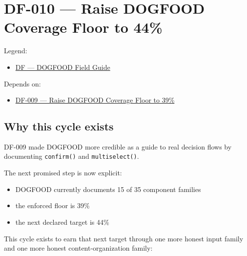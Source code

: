 \chapter{DF-010 --- Raise DOGFOOD Coverage Floor to 44\%}\label{record-072}

\smallskip

Legend:

\begin{itemize}
\tightlist
\item
  \href{https://github.com/flyingrobots/bijou/blob/1853ad902f6bf219326409e7f743a5a1d6517dbc/docs/legends/DF-dogfood-field-guide.md}{DF --- DOGFOOD Field Guide}
\end{itemize}

Depends on:

\begin{itemize}
\tightlist
\item
  \href{https://github.com/flyingrobots/bijou/blob/cbd70612140e7a450d764b3c7be1c6af878b99bc/docs/design/DF-009-raise-dogfood-coverage-floor-to-39-percent.md}{DF-009 --- Raise DOGFOOD Coverage Floor to 39\%}
\end{itemize}

\section{Why this cycle exists}\label{record-072-why-this-cycle-exists}

DF-009 made DOGFOOD more credible as a guide to real decision flows by documenting \texttt{c\allowbreak{}o\allowbreak{}n\allowbreak{}f\allowbreak{}i\allowbreak{}r\allowbreak{}m\allowbreak{}(\allowbreak{})} and \texttt{m\allowbreak{}u\allowbreak{}l\allowbreak{}t\allowbreak{}i\allowbreak{}s\allowbreak{}e\allowbreak{}l\allowbreak{}e\allowbreak{}c\allowbreak{}t\allowbreak{}(\allowbreak{})}.

The next promised step is now explicit:

\begin{itemize}
\tightlist
\item
  DOGFOOD currently documents 15 of 35 component families
\item
  the enforced floor is 39\%
\item
  the next declared target is 44\%
\end{itemize}

This cycle exists to earn that next target through one more honest input family and one more honest content-organization family:

